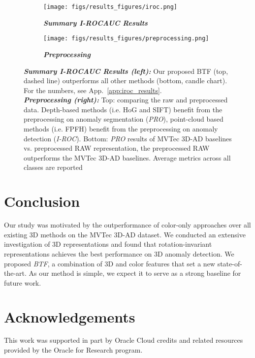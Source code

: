 \documentclass{article}
\begin{document}
\begin{figure}[t]

\begin{subfigure}{0.5\textwidth}
\texttt{[image: figs/results\_figures/iroc.png]}
\caption{\textit{\textbf{Summary I-ROCAUC Results}}}
\label{fig:image_rocauc}
\end{subfigure}
\begin{subfigure}{0.5\textwidth}
\texttt{[image: figs/results\_figures/preprocessing.png]}
\caption{\textit{\textbf{Preprocessing}}}
\label{fig:preprocessing_ablation}
\end{subfigure}
\caption{\textit{\textbf{Summary I-ROCAUC Results (left):}} Our proposed BTF (top, dashed line) outperforms all  other methods (bottom, candle chart). For the numbers, see App.~\ref{app:iroc_results}.\\ \textit{\textbf{Preprocessing (right):}} Top: comparing the raw and preprocessed data. Depth-based methods (i.e. HoG and SIFT) benefit from the preprocessing on anomaly segmentation (\textit{PRO}), point-cloud based methods (i.e. FPFH) benefit from the preprocessing on anomaly detection (\textit{I-ROC}).  Bottom: \textit{PRO} results of MVTec 3D-AD baselines vs. preprocessed RAW representation, the preprocessed RAW outperforms the MVTec 3D-AD baselines. Average metrics across all classes are reported
}
\end{figure}




\section{Conclusion}
Our study was motivated by the outperformance of color-only approaches over all existing 3D methods on the MVTec 3D-AD dataset. We conducted an extensive investigation of 3D representations and found that rotation-invariant representations achieves the best performance on 3D anomaly detection. We proposed \textit{BTF}, a combination of 3D and color features that set a new state-of-the-art. As our method is simple, we expect it to serve as a strong baseline for future work.


\section{Acknowledgements}
This work was supported in part by Oracle Cloud credits and related resources provided by the Oracle for Research program.

\clearpage


\end{document}
